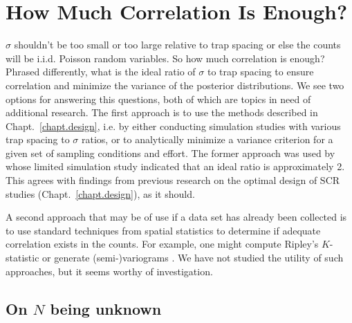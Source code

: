 \section{How Much Correlation Is Enough?}
$\sigma$ shouldn't be too small or too large relative to trap
spacing or else the counts will be i.i.d. Poisson random variables. So
how much correlation is enough? Phrased differently, what is the ideal
ratio of $\sigma$ to trap spacing to ensure correlation and minimize
the variance of the posterior distributions. We see two options for
answering this questions, both of which are topics in need of
additional research. The first approach is to use the methods
described in Chapt.~\ref{chapt.design}, i.e. by either conducting
simulation studies with various trap spacing to $\sigma$ ratios, or to
analytically minimize a variance criterion for a given set of
sampling conditions and effort. The former approach was used by
\citet{chandler_royle:2012} whose limited simulation study indicated
that an ideal ratio is approximately 2. This agrees with
findings from previous research on the optimal design of SCR studies
(Chapt.~\ref{chapt.design}), as it should.

A second approach that may be of use if a data set has already been
collected is to use standard techniques from spatial statistics to
determine if adequate correlation exists in the counts. For example,
one might compute Ripley's $K$-statistic or generate (semi-)variograms
\citep{illian_etal:2008}. We have not studied the utility of such
approaches, but it seems worthy of investigation.



\subsection{On $N$ being unknown}
\label{unmarked.sec.N}

